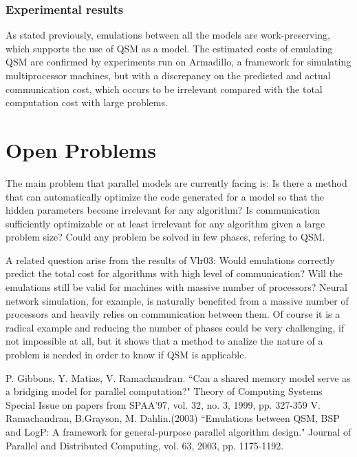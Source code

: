 \documentclass[12pt,a4paper]{article}
\begin{document}
\subsubsection{Experimental results}
As stated previously, emulations between all the models are work-preserving, which supports the use of QSM as a model. The estimated costs of emulating QSM are confirmed by experiments run on Armadillo, a framework for simulating multiprocessor machines, but with a discrepancy on the predicted and actual communication cost, which occurs to be irrelevant compared with the total computation cost with large problems.

\newpage
\section{Open Problems}

The main problem that parallel models are currently facing is: Is there a method that can automatically optimize the code generated for a model so that the hidden parameters become irrelevant for any algorithm? Is communication sufficiently optimizable or at least irrelevant for any algorithm given a large problem size? Could any problem be solved in few phases, refering to QSM.

A related question arise from the results of {Vlr03}: Would emulations correctly predict the total cost for algorithms with high level of communication? Will the emulations still be valid for machines with massive number of processors? Neural network simulation, for example, is naturally benefited from a massive number of processors and heavily relies on communication between them. Of course it is a radical example and reducing the number of phases could be very challenging, if not impossible at all, but it shows that a method to analize the nature of a problem is needed in order to know if QSM is applicable.

\newpage
\singlespace
\begin{thebibliography}{9}

 P. Gibbons, Y. Matias, V. Ramachandran. ``Can a shared memory model serve as a bridging model for parallel computation?" Theory of Computing Systems Special Issue on papers from SPAA'97, vol. 32, no. 3, 1999, pp. 327-359
 V. Ramachandran, B.Grayson, M. Dahlin.(2003) ``Emulations between QSM, BSP and LogP: A framework for general-purpose parallel algorithm design." Journal of Parallel and Distributed Computing, vol. 63, 2003, pp. 1175-1192. 
\end{thebibliography}
\end{document}
